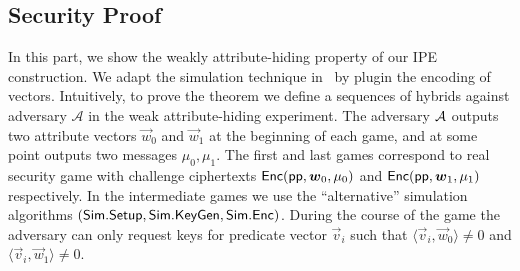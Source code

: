 \subsection{Security Proof}
In this part, we show the weakly attribute-hiding property of our IPE construction. We adapt the simulation technique in~\cite{AC:AgrFreVai11} by plugin the encoding of vectors. Intuitively, to prove the theorem we define a sequences of hybrids against adversary $\mathcal{A}$ in the weak attribute-hiding experiment. The adversary $\mathcal{A}$ outputs two attribute vectors $\vec{w}_{0}$ and $\vec{w}_{1}$ at the beginning of each game, and at some point outputs two messages $\mu_{0},\mu_{1}$. The first and last games correspond to real security game with challenge ciphertexts $\mathsf{Enc}(\mathsf{pp},\boldsymbol{w}_{0},\mu_{0})$ and $\mathsf{Enc}(\mathsf{pp},\boldsymbol{w}_{1},\mu_{1})$ respectively. In the intermediate games we use the ``alternative'' simulation algorithms $(\mathsf{Sim}.\mathsf{Setup},\mathsf{Sim}.\mathsf{KeyGen}, \mathsf{Sim}.\mathsf{Enc})$. During the course of the game the adversary can only request keys for predicate vector $\vec{v}_i$ such that $\langle \vec{v}_i, \vec{w}_{0} \rangle \neq 0$ and $\langle \vec{v}_i, \vec{w}_{1} \rangle \neq 0$.

